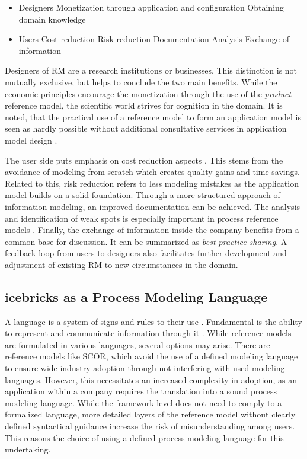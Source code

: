 		\begin{itemize}
			\item Designers
			\subitem Monetization through application and configuration
			\subitem Obtaining domain knowledge
			\item Users
			\subitem Cost reduction
			\subitem Risk reduction
			\subitem Documentation
			\subitem Analysis
			\subitem Exchange of information  
		\end{itemize} 
	
		Designers of \acrshort{RM} are a research institutions or businesses. This distinction is not mutually exclusive,  but helps to conclude the two main benefits. While the economic principles encourage the monetization through the use of the \textit{product} reference model, the scientific world strives for cognition in the domain. It is noted, that the practical use of a reference model to form an application model is seen as hardly possible without additional consultative services in application model design \citep{Schutte1998}.
	
		The user side puts emphasis on cost reduction aspects \citep[]{Schutte1998}. This stems from the avoidance of modeling from scratch which creates quality gains and time savings. Related to this, risk reduction refers to less modeling mistakes as the application model builds on a solid foundation. Through a more structured approach of information modeling, an improved documentation can be achieved. The analysis and identification of weak spots is especially important in process reference models \citep[]{becker2004handelsinformationssysteme}. Finally, the exchange of information inside the company benefits from a common base for discussion. It can be summarized as \textit{best practice sharing}. A feedback loop from users to designers also facilitates further development and adjustment of existing \acrshort{RM} to new circumstances in the domain. 
		
		\subsection{icebricks as a Process Modeling Language}
		\label{sec:iceb}
	 A language is a system of signs and rules to their use \citep[]{holten1999}. Fundamental is the ability to represent and communicate information through it \citep[]{brocke2003referenzmodellierung}. While reference models are formulated in various languages, several options may arise. There are reference models like \acrshort{SCOR}, which avoid the use of a defined modeling language to ensure wide industry adoption through not interfering with used modeling languages. However, this necessitates an increased complexity in adoption, as an application within a company requires the translation into a sound process modeling language. While the framework level does not need to comply to a formalized language, more detailed layers of the reference model without clearly defined syntactical guidance increase the risk of misunderstanding among users.
	 This reasons the choice of using a defined process modeling language for this undertaking.
	 
